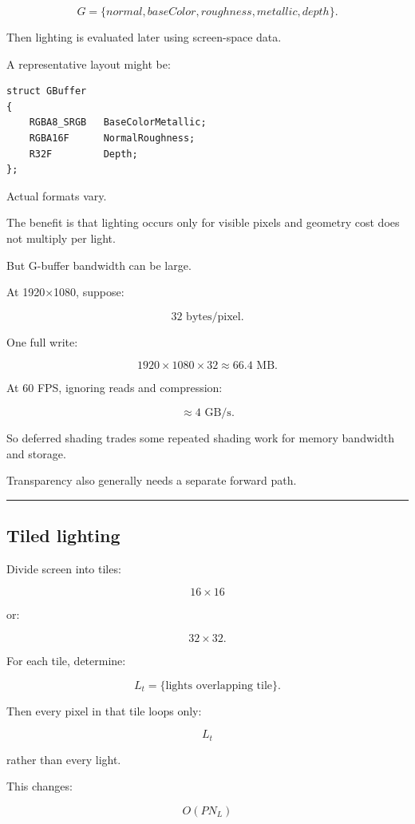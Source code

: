 \[
G=
\{
normal,
baseColor,
roughness,
metallic,
depth
\}.
\]

Then lighting is evaluated later using screen-space data.

A representative layout might be:

\begin{verbatim}
struct GBuffer
{
    RGBA8_SRGB   BaseColorMetallic;
    RGBA16F      NormalRoughness;
    R32F         Depth;
};
\end{verbatim}

Actual formats vary.

The benefit is that lighting occurs only for visible pixels and geometry cost does not multiply per light.

But G-buffer bandwidth can be large.

At 1920×1080, suppose:

\[
32\text{ bytes/pixel}.
\]

One full write:

\[
1920\times1080\times32
\approx66.4\text{ MB}.
\]

At 60 FPS, ignoring reads and compression:

\[
\approx4\text{ GB/s}.
\]

So deferred shading trades some repeated shading work for memory bandwidth and storage.

Transparency also generally needs a separate forward path.

\begin{center}\rule{0.5\linewidth}{0.5pt}\end{center}

\subsection{Tiled lighting}\label{04-visual-computing-ii-ch040-tiled-lighting}

Divide screen into tiles:

\[
16\times16
\]

or:

\[
32\times32.
\]

For each tile, determine:

\[
L_t=
\{\text{lights overlapping tile}\}.
\]

Then every pixel in that tile loops only:

\[
L_t
\]

rather than every light.

This changes:

\[
O(PN_L)
\]

